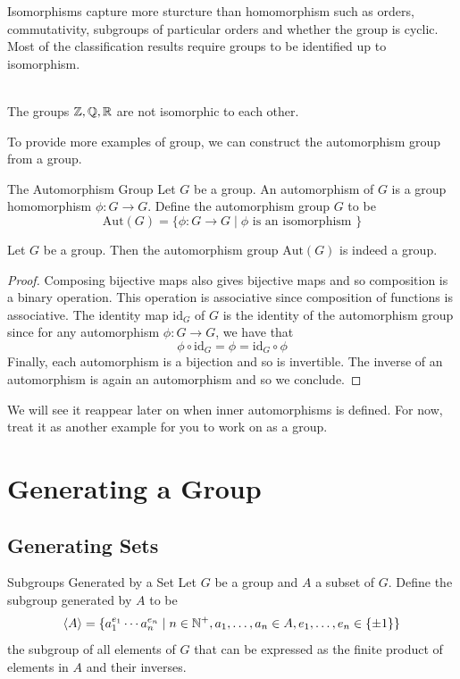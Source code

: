 \documentclass[a4paper]{article}
\begin{document}
Isomorphisms capture more sturcture than homomorphism such as orders, commutativity, subgroups of particular orders and whether the group is cyclic. Most of the classification results require groups to be identified up to isomorphism. 

\begin{eg}{}{}\\
The groups $\mathbb{Z},\mathbb{Q},\mathbb{R}$ are not isomorphic to each other. 
\end{eg}

To provide more examples of group, we can construct the automorphism group from a group. 

\begin{defn}{The Automorphism Group}{} Let $G$ be a group. An automorphism of $G$ is a group homomorphism $\phi:G\to G$. Define the automorphism group $G$ to be $$\text{Aut}(G)=\{\phi:G\to G\;|\;\phi\text{ is an isomorphism }\}$$
\end{defn}

\begin{lmm}{}{} Let $G$ be a group. Then the automorphism group $\text{Aut}(G)$ is indeed a group. 
\begin{proof}
Composing bijective maps also gives bijective maps and so composition is a binary operation. This operation is associative since composition of functions is associative. The identity map $\text{id}_G$ of $G$ is the identity of the automorphism group since for any automorphism $\phi:G\to G$, we have that $$\phi\circ\text{id}_G=\phi=\text{id}_G\circ\phi$$ Finally, each automorphism is a bijection and so is invertible. The inverse of an automorphism is again an automorphism and so we conclude. 
\end{proof}
\end{lmm}

We will see it reappear later on when inner automorphisms is defined. For now, treat it as another example for you to work on as a group. 

\pagebreak
\section{Generating a Group}
\subsection{Generating Sets}
\begin{defn}{Subgroups Generated by a Set}{} Let $G$ be a group and $A$ a subset of $G$. Define the subgroup generated by $A$ to be $$\langle A\rangle=\{a_1^{e_1}\cdots a_n^{e_n}\;|\;n\in\mathbb{N}^+, a_1,\dots,a_n\in A, e_1,\dots,e_n\in\{\pm1\}\}$$ the subgroup of all elements of $G$ that can be expressed as the finite product of elements in $A$ and their inverses. 
\end{defn}
\end{document}
